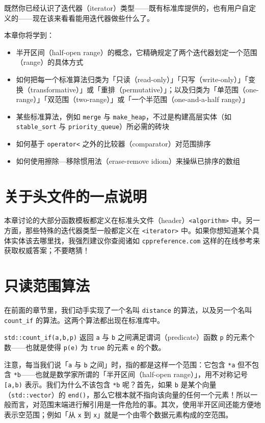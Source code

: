 既然你已经认识了迭代器（iterator）类型——既有标准库提供的，也有用户自定义的——现在该来看看能用迭代器做些什么了。

本章你将学到：

\begin{itemize}
\item 半开区间（half-open range）的概念，它精确规定了两个迭代器划定一个范围（range）的具体方式
\item 如何把每一个标准算法归类为「只读（read-only）」「只写（write-only）」「变换（transformative）」或「重排（permutative）」；以及归类为「单范围（one-range）」「双范围（two-range）」或「一个半范围（one-and-a-half range）」
\item 某些标准算法，例如 \texttt{merge} 与 \texttt{make\_\allowbreak{}heap}，不过是构建高层实体（如 \texttt{stable\_\allowbreak{}sort} 与 \texttt{priority\_\allowbreak{}queue}）所必需的砖块
\item 如何基于 \texttt{operator<} 之外的比较器（comparator）对范围排序
\item 如何使用擦除—移除惯用法（erase-remove idiom）来操纵已排序的数组
\end{itemize}

\section{关于头文件的一点说明}

本章讨论的大部分函数模板都定义在标准头文件（header）\texttt{<algorithm>\allowbreak{}} 中。另一方面，那些特殊的迭代器类型一般都定义在 \texttt{<iterator>\allowbreak{}} 中。如果你想知道某个具体实体该去哪里找，我强烈建议你查阅诸如 \texttt{cppreference.\allowbreak{}com} 这样的在线参考来获取权威答案；不要瞎猜！

\section{只读范围算法}

在前面的章节里，我们动手实现了一个名叫 \texttt{distance} 的算法，以及另一个名叫 \texttt{count\_\allowbreak{}if} 的算法。这两个算法都出现在标准库中。

\texttt{std::\allowbreak{}count\_\allowbreak{}if(\allowbreak{}a,\allowbreak{}b,\allowbreak{}p)\allowbreak{}} 返回 \texttt{a} 与 \texttt{b} 之间满足谓词（predicate）函数 \texttt{p} 的元素个数——也就是使得 \texttt{p(\allowbreak{}e)\allowbreak{}} 为 \texttt{true} 的元素 \texttt{e} 的个数。

注意，每当我们说「\texttt{a} 与 \texttt{b} 之间」时，指的都是这样一个范围：它包含 \texttt{*a} 但不包含 \texttt{*b}——也就是数学家所谓的「半开区间（half-open range）」，用不对称记号 \texttt{[a,\allowbreak{}b)\allowbreak{}} 表示。我们为什么不该包含 \texttt{*b} 呢？首先，如果 \texttt{b} 是某个向量（\texttt{std::\allowbreak{}vector}）的 \texttt{end(\allowbreak{})\allowbreak{}}，那么它根本就不指向该向量的任何一个元素！所以一般而言，对范围末端进行解引用是一件危险的事。其次，使用半开区间还能方便地表示空范围；例如「从 \texttt{x} 到 \texttt{x}」就是一个由零个数据元素构成的空范围。

